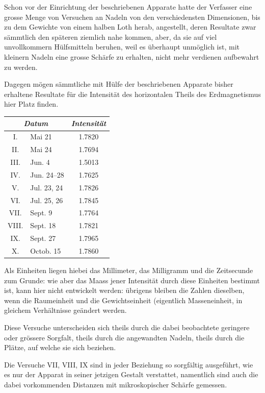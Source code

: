 \documentclass[12pt,a4paper]{article}
\begin{document}
Schon vor der Einrichtung der beschriebenen Apparate hatte der Verfasser eine grosse Menge von Versuchen an Nadeln von den verschiedensten Dimensionen, bis zu dem Gewichte von einem halben Loth herab, angestellt, deren Resultate zwar sämmtlich den späteren ziemlich nahe kommen, aber, da sie auf viel unvollkommern Hülfsmitteln beruhen, weil es überhaupt unmöglich ist, mit kleinern Nadeln eine grosse Schärfe zu erhalten, nicht mehr verdienen aufbewahrt zu werden.

Dagegen mögen sämmtliche mit Hülfe der beschriebenen Apparate bisher erhaltene Resultate für die Intensität des horizontalen Theils des Erdmagnetismus hier Platz finden.

\bigskip

\begin{center}
\begin{tabular}{clc}
\toprule
\multicolumn{2}{c}{\textit{Datum}} & \textit{Intensität} \\
\midrule
I. & Mai 21 & 1.7820 \\
II. & Mai 24 & 1.7694 \\
III. & Jun. 4 & 1.5013 \\
IV. & Jun. 24--28 & 1.7625 \\
V. & Jul. 23, 24 & 1.7826 \\
VI. & Jul. 25, 26 & 1.7845 \\
VII. & Sept. 9 & 1.7764 \\
VIII. & Sept. 18 & 1.7821 \\
IX. & Sept. 27 & 1.7965 \\
X. & Octob. 15 & 1.7860 \\
\bottomrule
\end{tabular}
\end{center}

\bigskip

Als Einheiten liegen hiebei das Millimeter, das Milligramm und die Zeitsecunde zum Grunde: wie aber das Maass jener Intensität durch diese Einheiten bestimmt ist, kann hier nicht entwickelt werden: übrigens bleiben die Zahlen dieselben, wenn die Raumeinheit und die Gewichtseinheit (eigentlich Masseneinheit, in gleichem Verhältnisse geändert werden.

Diese Versuche unterscheiden sich theils durch die dabei beobachtete geringere oder grössere Sorgfalt, theils durch die angewandten Nadeln, theils durch die Plätze, auf welche sie sich beziehen.

Die Versuche VII, VIII, IX sind in jeder Beziehung so sorgfältig ausgeführt, wie es nur der Apparat in seiner jetzigen Gestalt verstattet, namentlich sind auch die dabei vorkommenden Distanzen mit mikroskopischer Schärfe gemessen.
\end{document}
